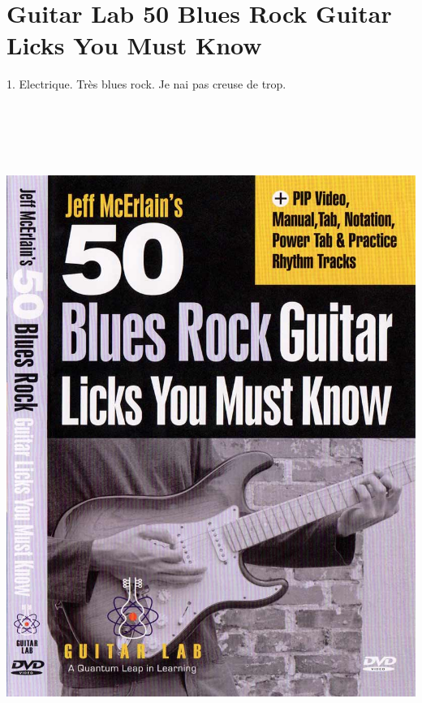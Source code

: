\documentclass[a4paper]{book}
\begin{document}
\clearpage\section[Guitar Lab 50 Blues Rock Guitar Licks You Must
Know]{Guitar Lab 50 Blues Rock Guitar Licks You Must Know}
\hypertarget{RefHeadingToc144973218262}{}1. Electrique. Tr\`es blues
rock. Je n{\textquotesingle}ai pas creuse de trop.






\begin{center}
\includegraphics[width=17cm,height=21.652cm]{lebluessupportsmethodes-img78.jpg}
\end{center}
\end{document}
